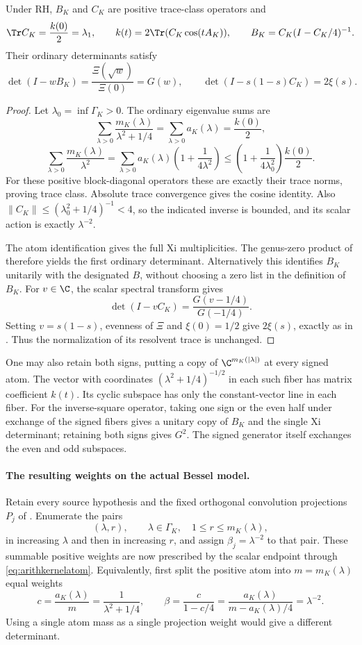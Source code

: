 \begin{proposition}
Under RH, \(B_K\) and \(C_K\) are positive trace-class operators and
\[
 \Tr C_K=\frac{k(0)}2=\lambda_1,\qquad
 k(t)=2\Tr(C_K\cos(tA_K)),\qquad
 B_K=C_K(I-C_K/4)^{-1}.
\]
Their ordinary determinants satisfy
\[
 \det(I-wB_K)=\frac{\Xi(\sqrt w)}{\Xi(0)}=G(w),
 \qquad
 \det(I-s(1-s)C_K)=2\xi(s).
\]
\end{proposition}
\begin{proof}
Let \(\lambda_0=\inf\Gamma_K>0\). The ordinary eigenvalue sums are
\[
 \sum_{\lambda>0}\frac{m_K(\lambda)}{\lambda^2+1/4}
 =\sum_{\lambda>0}a_K(\lambda)=\frac{k(0)}2,
\]
\[
 \sum_{\lambda>0}\frac{m_K(\lambda)}{\lambda^2}
 =\sum_{\lambda>0}a_K(\lambda)
       \left(1+\frac1{4\lambda^2}\right)
 \le\left(1+\frac1{4\lambda_0^2}\right)\frac{k(0)}2.
\]
For these positive block-diagonal operators these are exactly their
trace norms, proving trace class. Absolute trace convergence gives
the cosine identity. Also
\(\|C_K\|\le(\lambda_0^2+1/4)^{-1}<4\), so the indicated inverse
is bounded, and its scalar action is exactly \(\lambda^{-2}\).

The atom identification gives the full Xi multiplicities. The
genus-zero product of  therefore yields the first
ordinary determinant. Alternatively this identifies \(B_K\)
unitarily with the designated \(B\), without choosing a zero list
in the definition of \(B_K\).
For \(v\in\C\), the scalar spectral transform gives
\[
 \det(I-vC_K)=\frac{G(v-1/4)}{G(-1/4)}.
\]
Setting \(v=s(1-s)\), evenness of \(\Xi\) and
\(\xi(0)=1/2\) give \(2\xi(s)\), exactly as in .
Thus the normalization of its resolvent trace is unchanged.
\end{proof}

One may also retain both signs, putting a copy of
\(\C^{m_K(|\lambda|)}\) at every signed atom. The vector with
coordinates \((\lambda^2+1/4)^{-1/2}\) in each such fiber has
matrix coefficient \(k(t)\). Its cyclic subspace has only the
constant-vector line in each fiber. For the inverse-square operator,
taking one sign or the even half under exchange of the signed fibers
gives a unitary copy of \(B_K\) and the single Xi determinant;
retaining both signs gives \(G^2\). The signed generator itself
exchanges the even and odd subspaces.

\paragraph{The resulting weights on the actual Bessel model.}
Retain every source hypothesis and the fixed orthogonal convolution
projections \(P_j\) of . Enumerate the pairs
\[
 (\lambda,r),\qquad \lambda\in\Gamma_K,\quad
 1\le r\le m_K(\lambda),
\]
in increasing \(\lambda\) and then in increasing \(r\), and assign
\(\beta_j=\lambda^{-2}\) to that pair. These summable positive
weights are now prescribed by the scalar endpoint through
\eqref{eq:arithkernelatom}. Equivalently, first split the positive
atom into \(m=m_K(\lambda)\) equal weights
\[
 c=\frac{a_K(\lambda)}m=\frac1{\lambda^2+1/4},
 \qquad
 \beta=\frac{c}{1-c/4}
       =\frac{a_K(\lambda)}{m-a_K(\lambda)/4}
       =\lambda^{-2}.
\]
Using a single atom mass as a single projection weight would
give a different determinant.

